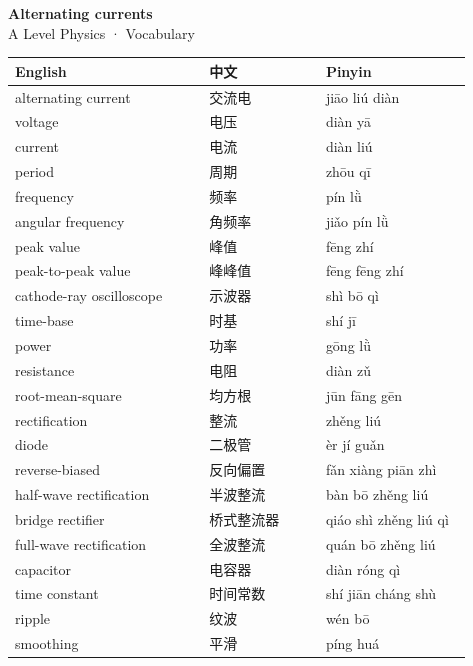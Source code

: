 \documentclass[11pt]{article}
\begin{document}
\begin{center}
  {\LARGE\bfseries Alternating currents}\\[0.35em]
  {\large A Level Physics · Vocabulary}
\end{center}
\vspace{0.6em}

\begin{longtable}{@{}p{0.40\linewidth}p{0.24\linewidth}p{0.30\linewidth}@{}}
\toprule
\textbf{English} & \textbf{中文} & \textbf{Pinyin} \\
\midrule
\endhead
\bottomrule
\endlastfoot
alternating current & 交流电 & jiāo liú diàn \\
voltage & 电压 & diàn yā \\
current & 电流 & diàn liú \\
period & 周期 & zhōu qī \\
frequency & 频率 & pín lǜ \\
angular frequency & 角频率 & jiǎo pín lǜ \\
peak value & 峰值 & fēng zhí \\
peak-to-peak value & 峰峰值 & fēng fēng zhí \\
cathode-ray oscilloscope & 示波器 & shì bō qì \\
time-base & 时基 & shí jī \\
power & 功率 & gōng lǜ \\
resistance & 电阻 & diàn zǔ \\
root-mean-square & 均方根 & jūn fāng gēn \\
rectification & 整流 & zhěng liú \\
diode & 二极管 & èr jí guǎn \\
reverse-biased & 反向偏置 & fǎn xiàng piān zhì \\
half-wave rectification & 半波整流 & bàn bō zhěng liú \\
bridge rectifier & 桥式整流器 & qiáo shì zhěng liú qì \\
full-wave rectification & 全波整流 & quán bō zhěng liú \\
capacitor & 电容器 & diàn róng qì \\
time constant & 时间常数 & shí jiān cháng shù \\
ripple & 纹波 & wén bō \\
smoothing & 平滑 & píng huá \\
\end{longtable}
\end{document}
